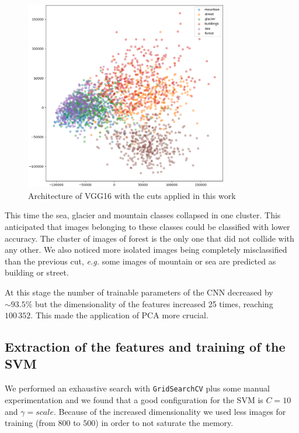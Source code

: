 \documentclass[compsoc]{IEEEtran}
\begin{document}
\begin{figure}[ht!]
\centering                                                                        
\includegraphics[width=3.5in]{../images/pca-3.png}
\captionsetup{justification=centering}                                                                                         
\caption{Architecture of VGG16 with the cuts applied in this work}
\label{fig:pca3}                                                                                                                               
\end{figure}

This time the sea, glacier and mountain classes collapsed in one cluster. This anticipated that images belonging to these classes could be classified with lower accuracy.
The cluster of images of forest is the only one that did not collide with any other.
We also noticed more isolated images being completely misclassified than the previous cut, \emph{e.g.} some images of mountain or sea are predicted as building or street.
\par



At this stage the number of trainable parameters of the CNN decreased by ${\sim93.5\%}$ but the dimensionality of the features increased 25 times, reaching $100\,352$. This made the application of PCA more crucial. 


\subsection{Extraction of the features and training of the SVM}
We performed an exhaustive search with \texttt{GridSearchCV} plus some manual experimentation and we found that a good configuration for the SVM is $C=10$ and $\gamma=scale$. Because of the increased dimensionality we used less images for training (from $800$ to $500$) in order to not saturate the memory. 	\par
\end{document}
